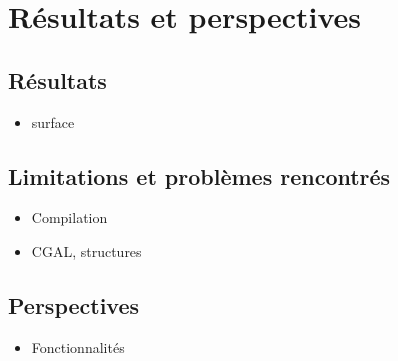 \chapter{Résultats et perspectives}

\section{Résultats}
\begin{itemize}
  \item surface
\end{itemize}

\section{Limitations et problèmes rencontrés}
\begin{itemize}
  \item Compilation
  \item CGAL, structures
\end{itemize}

\section{Perspectives}
\begin{itemize}
  \item Fonctionnalités
\end{itemize}

